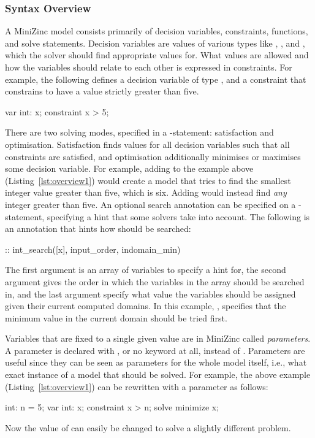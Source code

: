 \documentclass[a4paper,12pt]{article}
\begin{document}
\subsubsection{Syntax Overview}\label{sec:mzn:syntax}
A MiniZinc model consists primarily of decision variables, constraints,
functions, and solve statements. Decision variables are values of various types like
, , and , which the solver should find appropriate values for.
What values are allowed and how the variables should relate to each other is expressed in
constraints. For example, the following defines a decision variable  of type
, and a constraint that constrains  to have a value strictly greater than
five.
\begin{mznnobreak}[label=lst:overview1,caption={\null}]
var int: x;
constraint x > 5;
\end{mznnobreak}

\begin{sloppypar}
There are two solving modes, specified in a -statement: satisfaction and optimisation. Satisfaction
finds values for all decision variables such that all constraints are satisfied, and
optimisation additionally minimises or maximises some decision variable.
For example, adding  to the example above (Listing~\ref{lst:overview1}) would create a
model that tries to find the smallest integer value greater than five, which is
six. Adding  would instead find \emph{any} integer greater than
five. An optional search annotation can be specified on a -statement, specifying
a hint that some solvers take into account. The following is an annotation that
hints how  should be searched:
\end{sloppypar}
\begin{mznnobreak}
:: int_search([x], input_order, indomain_min)
\end{mznnobreak}
The first argument is an array of variables to specify a hint for, the
second argument gives the order in which the variables in the array should be searched in,
and the last argument specify what value the variables should be assigned given their
current computed domains. In this example, , specifies that the minimum
value in the current domain should be tried first.

Variables that are fixed to a single given value are in MiniZinc called \emph{parameters}.
A parameter is declared with , or no keyword at all, instead of .
Parameters are useful since they can be seen as parameters for the whole model itself,
i.e., what exact instance of a model that should be solved.
For example, the above example (Listing~\ref{lst:overview1}) can be rewritten with a parameter as follows:
\begin{mznnobreak}
int: n = 5;
var int: x;
constraint x > n;
solve minimize x;
\end{mznnobreak}
Now the value of  can easily be changed to solve a slightly different problem.
\end{document}
